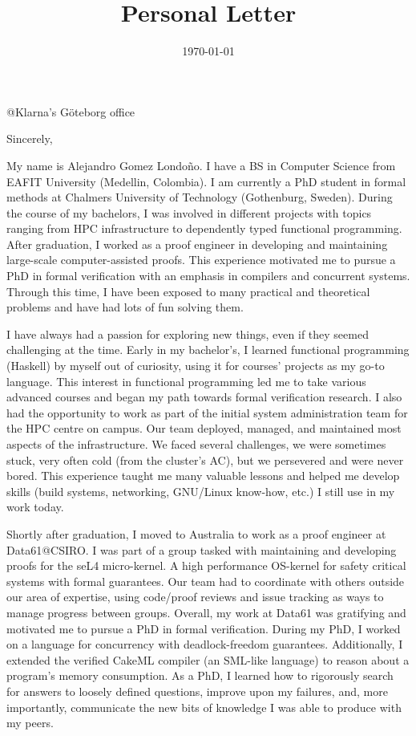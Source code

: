 \documentclass[11pt,a4paper,sans]{moderncv}        %
\title{Personal Letter}                               %
\begin{document}

          {@Klarna's Göteborg office}
\date{\today}

\opening{}

\closing{Sincerely,}

\makelettertitle

\justify

My name is Alejandro Gomez Londoño. I have a BS in Computer Science
from EAFIT University (Medellin, Colombia). I am currently a PhD
student in formal methods at Chalmers University of Technology
(Gothenburg, Sweden). During the course of my bachelors, I was
involved in different projects with topics ranging from HPC
infrastructure to dependently typed functional programming. After
graduation, I worked as a proof engineer in developing and maintaining
large-scale computer-assisted proofs. This experience motivated me to
pursue a PhD in formal verification with an emphasis in compilers and
concurrent systems. Through this time, I have been exposed to many
practical and theoretical problems and have had lots of fun solving
them.

I have always had a passion for exploring new things, even if they
seemed challenging at the time.  Early in my bachelor's, I learned
functional programming (Haskell) by myself out of curiosity, using it
for courses' projects as my go-to language. This interest in
functional programming led me to take various advanced courses and
began my path towards formal verification research.  I also had the
opportunity to work as part of the initial system administration team
for the HPC centre on campus. Our team deployed, managed, and
maintained most aspects of the infrastructure. We faced several
challenges, we were sometimes stuck, very often cold (from the
cluster's AC), but we persevered and were never bored. This experience
taught me many valuable lessons and helped me develop skills (build
systems, networking, GNU/Linux know-how, etc.) I still use in my work
today.

Shortly after graduation, I moved to Australia to work as a proof
engineer at Data61@CSIRO. I was part of a group tasked with
maintaining and developing proofs for the seL4 micro-kernel.  A high
performance OS-kernel for safety critical systems with formal
guarantees. Our team had to coordinate with others outside our area of
expertise, using code/proof reviews and issue tracking as ways to
manage progress between groups. Overall, my work at Data61 was
gratifying and motivated me to pursue a PhD in formal verification.
During my PhD, I worked on a language for concurrency with
deadlock-freedom guarantees. Additionally, I extended the verified
CakeML compiler (an SML-like language) to reason about a program's
memory consumption. As a PhD, I learned how to rigorously search for
answers to loosely defined questions, improve upon my failures, and,
more importantly, communicate the new bits of knowledge I was able to
produce with my peers.
\end{document}
